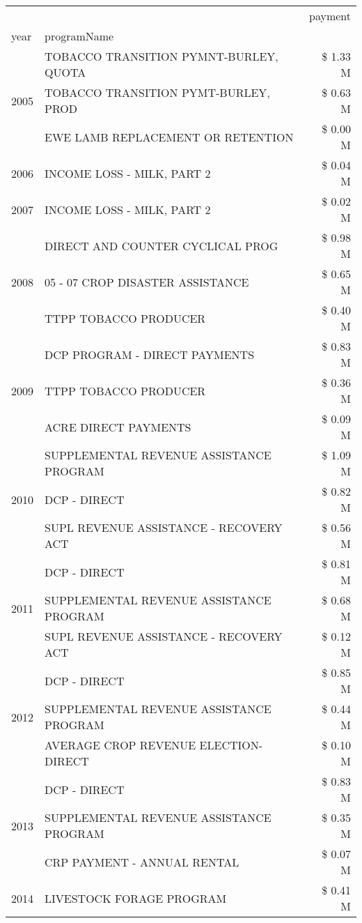 \begin{tabular}{llr}
\toprule
 &  & payment \\
year & programName &  \\
\midrule
\multirow[t]{3}{*}{2005} & TOBACCO TRANSITION PYMNT-BURLEY, QUOTA & \$ 1.33 M \\
 & TOBACCO TRANSITION PYMT-BURLEY, PROD & \$ 0.63 M \\
 & EWE LAMB REPLACEMENT OR RETENTION & \$ 0.00 M \\
\cline{1-3}
2006 & INCOME LOSS - MILK, PART 2 & \$ 0.04 M \\
\cline{1-3}
2007 & INCOME LOSS - MILK, PART 2 & \$ 0.02 M \\
\cline{1-3}
\multirow[t]{3}{*}{2008} & DIRECT AND COUNTER CYCLICAL PROG & \$ 0.98 M \\
 & 05 - 07 CROP DISASTER ASSISTANCE & \$ 0.65 M \\
 & TTPP TOBACCO PRODUCER & \$ 0.40 M \\
\cline{1-3}
\multirow[t]{3}{*}{2009} & DCP PROGRAM - DIRECT PAYMENTS & \$ 0.83 M \\
 & TTPP TOBACCO PRODUCER & \$ 0.36 M \\
 & ACRE DIRECT PAYMENTS & \$ 0.09 M \\
\cline{1-3}
\multirow[t]{3}{*}{2010} & SUPPLEMENTAL REVENUE ASSISTANCE PROGRAM & \$ 1.09 M \\
 & DCP - DIRECT & \$ 0.82 M \\
 & SUPL REVENUE ASSISTANCE - RECOVERY ACT & \$ 0.56 M \\
\cline{1-3}
\multirow[t]{3}{*}{2011} & DCP - DIRECT & \$ 0.81 M \\
 & SUPPLEMENTAL REVENUE ASSISTANCE PROGRAM & \$ 0.68 M \\
 & SUPL REVENUE ASSISTANCE - RECOVERY ACT & \$ 0.12 M \\
\cline{1-3}
\multirow[t]{3}{*}{2012} & DCP - DIRECT & \$ 0.85 M \\
 & SUPPLEMENTAL REVENUE ASSISTANCE PROGRAM & \$ 0.44 M \\
 & AVERAGE CROP REVENUE ELECTION-DIRECT & \$ 0.10 M \\
\cline{1-3}
\multirow[t]{3}{*}{2013} & DCP - DIRECT & \$ 0.83 M \\
 & SUPPLEMENTAL REVENUE ASSISTANCE PROGRAM & \$ 0.35 M \\
 & CRP PAYMENT - ANNUAL RENTAL & \$ 0.07 M \\
\cline{1-3}
\multirow[t]{3}{*}{2014} & LIVESTOCK FORAGE PROGRAM & \$ 0.41 M \\

\end{tabular}
